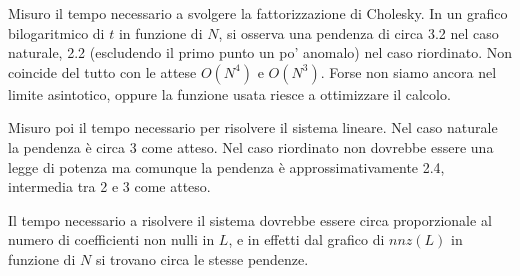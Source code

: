 \documentclass{article}
\begin{document}
Misuro il tempo necessario a svolgere la fattorizzazione di Cholesky.
In un grafico bilogaritmico di $t$ in funzione di $N$, si osserva una pendenza di circa 3.2 nel caso naturale, 2.2 (escludendo il primo punto un po' anomalo) nel caso riordinato.
Non coincide del tutto con le attese $O(N^4)$ e $O(N^3)$.
Forse non siamo ancora nel limite asintotico, oppure la funzione usata riesce a ottimizzare il calcolo.

Misuro poi il tempo necessario per risolvere il sistema lineare.
Nel caso naturale la pendenza è circa 3 come atteso.
Nel caso riordinato non dovrebbe essere una legge di potenza ma comunque la pendenza è approssimativamente 2.4, intermedia tra 2 e 3 come atteso.

Il tempo necessario a risolvere il sistema dovrebbe essere circa proporzionale al numero di coefficienti non nulli in $L$, e in effetti dal grafico di $nnz(L)$ in funzione di $N$ si trovano circa le stesse pendenze. 
\end{document}
